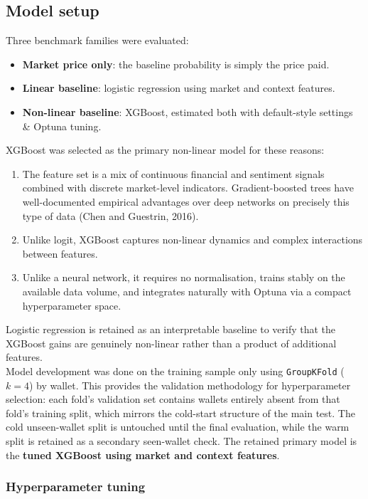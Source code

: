 \documentclass[11pt,a4paper]{article}
\newcommand{\edit}[1]{#1}
\begin{document}
\subsection{Model setup}

Three benchmark families were evaluated:
\begin{itemize}[label=--]
    \item \textbf{Market price only}: the baseline probability is simply the price paid.
    \item \textbf{Linear baseline}: logistic regression using market and context features.
    \item \textbf{Non-linear baseline}: XGBoost, estimated both with default-style settings \& Optuna tuning.
\end{itemize}

XGBoost was selected as the primary non-linear model for these reasons:
\begin{enumerate}
\item The feature set is a mix of continuous financial and sentiment signals combined with discrete market-level indicators. Gradient-boosted trees have well-documented empirical advantages over deep networks on precisely this type of data (Chen and Guestrin, 2016). 
\item Unlike logit, XGBoost captures non-linear dynamics and complex interactions between features. 
\item Unlike a neural network, it requires no normalisation, trains stably on the available data volume, and integrates naturally with Optuna via a compact hyperparameter space. 
\end{enumerate}
Logistic regression is retained as an interpretable baseline to verify that the XGBoost gains are genuinely non-linear rather than a product of additional features.\\

Model development was done on the training sample only using \edit{\texttt{GroupKFold} ($k{=}4$)} by wallet. This provides the validation methodology for hyperparameter selection: each fold's validation set contains wallets entirely absent from that fold's training split, which mirrors the cold-start structure of the main test. The cold unseen-wallet split is untouched until the final evaluation, while the warm split is retained as a secondary seen-wallet check. The retained primary model is the \textbf{tuned XGBoost using market and context features}.

\subsubsection*{Hyperparameter tuning}
\end{document}

